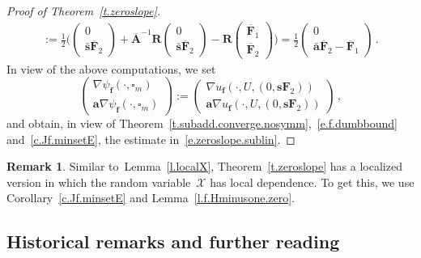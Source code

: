 \documentclass[11pt]{article} %
\let\oldsquare\square %
\renewcommand{\square}{\oldsquare}
\numberwithin{equation}{section}
\theoremstyle{definition}
\newtheorem{remark}[theorem]{Remark}
\newcommand{\f}{\mathbf{f}}
\newcommand{\s}{\mathbf{s}}
\renewcommand{\a}{\mathbf{a}}
\newcommand{\ahom}{\bar{\a}}
\newcommand{\shom}{\bar{\mathbf{s}}}
\newcommand{\cu}{\square}
\newcommand{\X}{\mathcal{X}}
\newcommand{\bfA}{\mathbf{A}}
\newcommand{\bfF}{\mathbf{F}}
\newcommand{\rota}{\mathbf{R}}
\begin{document}
\begin{proof}[{Proof of Theorem~\ref{t.zeroslope}}]
\begin{align*}
:=
\frac12 \biggl( \begin{pmatrix} 0  \\ \shom \overline{\bfF}_2 \end{pmatrix}     +  \overline{\bfA}^{-1} \rota \begin{pmatrix} 0  \\ \shom \overline{\bfF}_2 \end{pmatrix}  -   \rota \begin{pmatrix}  \overline{\bfF}_1 \\  \overline{\bfF}_2 \end{pmatrix} 
\biggr)
 = 
\frac12 \begin{pmatrix}  0 \\  \ahom\overline{\bfF}_2  - \overline{\bfF}_1 \end{pmatrix}
\,.
\end{align*}
In view of the above computations, we set
\begin{equation*}  
\begin{pmatrix} \nabla \psi_\f(\cdot,\cu_m)  \\ \a \nabla \psi_\f(\cdot,\cu_m) \end{pmatrix} 
:=
\begin{pmatrix} \nabla u_\f(\cdot,U,(0,\s \bfF_2))  \\ \a \nabla u_\f(\cdot,U,(0,\s \bfF_2)) \end{pmatrix} \,, 
\end{equation*}
and obtain, in view of Theorem~\ref{t.subadd.converge.nosymm},~\eqref{e.f.dumbbound} and~\eqref{c.Jf.minsetE}, the estimate in~\eqref{e.zeroslope.sublin}.
\end{proof}


\begin{remark} \label{r.zeroslope}
Similar to~Lemma~\ref{l.localX}, 
Theorem~\ref{t.zeroslope} has a localized version in which the random variable~$\X$ has local dependence. To get this, we use Corollary~\ref{c.Jf.minsetE} and Lemma~\ref{l.f.Hminusone.zero}.
\end{remark}












\subsection*{Historical remarks and further reading}
\end{document}
